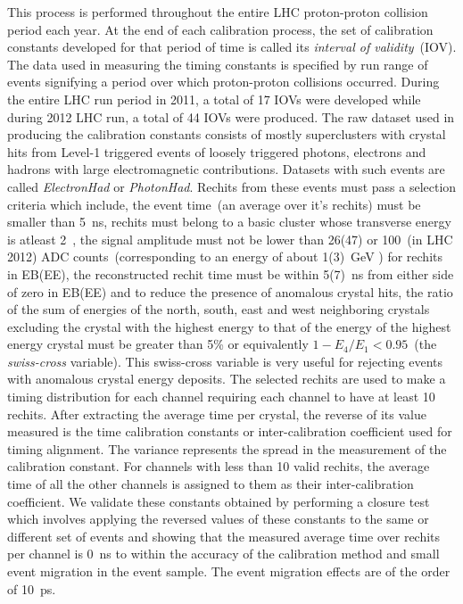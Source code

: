 This process is performed throughout the entire LHC proton-proton collision period each year. At the end of each calibration process, the set of calibration constants developed for that period of time is called its \textit{interval of validity}~(IOV). The data used in measuring the timing constants is specified by run range of events signifying a period over which proton-proton collisions occurred. During the entire LHC run period in 2011, a total of 17 IOVs were developed while during 2012 LHC run, a total of 44 IOVs were produced. The raw dataset used in producing the calibration constants consists of mostly superclusters with crystal hits from Level-1 triggered events of loosely triggered  photons, electrons and hadrons with large electromagnetic contributions. Datasets with such events are called \textit{ElectronHad} or \textit{PhotonHad}. Rechits from these events must pass a selection criteria which include, the event time~(an average over it's rechits) must be smaller than 5~ns, rechits must belong to a basic cluster whose transverse energy is atleast 2~\GeV, the signal amplitude must not be lower than 26(47) or 100~(in LHC 2012) ADC counts~(corresponding to an energy of about 1(3)~GeV ) for rechits in EB(EE), the reconstructed rechit time must be within 5(7)~ns from either side of zero in EB(EE) and to reduce the presence of anomalous crystal hits, the ratio of the sum of energies of the north, south, east and west neighboring crystals excluding the crystal with the highest energy to that of the energy of the highest energy crystal must be greater than 5\%  or equivalently $ 1 - E_{4}/E_{1} < 0.95$~(the \textit{swiss-cross} variable). This swiss-cross variable is very useful for rejecting events with anomalous crystal energy deposits. The selected rechits are used to make a timing distribution for each channel requiring each channel to have at least 10 rechits.
\newline
After extracting the average time per crystal, the reverse of its value measured is the time calibration constants or inter-calibration coefficient used for timing alignment. The variance represents the spread in the measurement of the calibration constant. For channels with less than 10 valid rechits, the average time of all the other channels is assigned to them as their inter-calibration coefficient. We validate these constants obtained by performing a closure test which involves  applying the reversed values of these constants to the same or different set of events and showing that the measured average time over rechits per channel is 0~ns to within the accuracy of the calibration method and small event migration in the event sample. The event migration effects are of the order of 10~ps.
